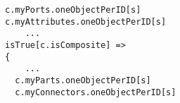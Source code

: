 \lstset{frame=tb, aboveskip=12pt, belowskip=-3pt, breaklines=true, basicstyle=\small\ttfamily, tabsize=2, mathescape=true}
\begin{lstlisting}[caption={wellformed\_components.als, lines 29-40}, label=alloy:WF_COMPONENT_ONE_CONSTITUENT_PER_UUID, captionpos=b]
c.myPorts.oneObjectPerID[s]
c.myAttributes.oneObjectPerID[s]
    ...
isTrue[c.isComposite] =>
{
    ...
  c.myParts.oneObjectPerID[s]
  c.myConnectors.oneObjectPerID[s]
\end{lstlisting}